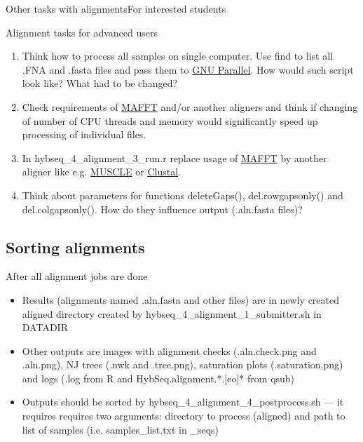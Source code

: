 \documentclass[compress, ucs, xelatex, 11pt, xcolor=x11names, aspectratio=169,
	hyperref={
		bookmarks=true,
		unicode=true,
		colorlinks=true,
		pdftitle={HybSeq course},
		plainpages=false,
		pdfauthor={Vojtech Zeisek},
		pdfsubject={Practical processing of HybSeq target enrichment sequencing data on computing grids like MetaCentrum},
		pdfcreator={XeLaTeX},
		pdfkeywords={BASH, command line, GNU, HybSeq, Linux, MetaCentrum, sequencing shell, target enrichment},
		linkcolor=Turquoise4, %
		anchorcolor=DodgerBlue4, %
		citecolor=DodgerBlue4, %
		filecolor=DodgerBlue4, %
		menucolor=Tan4, %
		urlcolor=DarkOliveGreen4, %
		pdftex},
	url={hyphens, lowtilde} %
	]{beamer}
\renewcommand{\texttt}[1]{\colorbox{Cornsilk2}{{\ttfamily #1}}}
\begin{document}
\begin{frame}{Other tasks with alignments}{For interested students}
	\begin{exampleblock}{Alignment tasks for advanced users}
		\begin{enumerate}
			\item Think how to process all samples on single computer. Use \texttt{find} to list all \texttt{*.FNA} and \texttt{*.fasta} files and pass them to \href{https://www.gnu.org/software/parallel/}{GNU Parallel}. How would such script look like? What had to be changed?
			\item Check requirements of \href{https://mafft.cbrc.jp/alignment/software/}{MAFFT} and/or another aligners and think if changing of number of CPU threads and memory would significantly speed up processing of individual files.
			\item In \texttt{hybseq\_4\_alignment\_3\_run.r} replace usage of \href{https://mafft.cbrc.jp/alignment/software/}{MAFFT} by another aligner like e.g. \href{https://www.drive5.com/muscle/}{MUSCLE} or \href{http://clustal.org/}{Clustal}.
			\item Think about parameters for functions \texttt{deleteGaps()}, \texttt{del.rowgapsonly()} and \texttt{del.colgapsonly()}. How do they influence output (\texttt{*.aln.fasta} files)?
		\end{enumerate}
	\end{exampleblock}
\end{frame}

\subsection{Sorting alignments}

\begin{frame}{After all alignment jobs are done}
	\begin{itemize}
		\item Results (alignments named \texttt{*.aln.fasta} and other files) are in newly created \texttt{aligned} directory created by \texttt{hybseq\_4\_alignment\_1\_submitter.sh} in \texttt{DATADIR}
		\item Other outputs are images with alignment checks (\texttt{*.aln.check.png} and \texttt{*.aln.png}), NJ trees (\texttt{*.nwk} and \texttt{*.tree.png}), saturation plots (\texttt{*.saturation.png}) and logs (\texttt{*.log} from \texttt{R} and \texttt{HybSeq.alignment.*.[eo]*} from \texttt{qsub})
		\item Outputs should be sorted by \texttt{hybseq\_4\_alignment\_4\_postprocess.sh} --- it requires requires two arguments: directory to process (\texttt{aligned}) and path to list of samples (i.e. \texttt{samples\_list.txt} in \texttt{2\_seqs})
	\end{itemize}
\end{frame}
\end{document}
